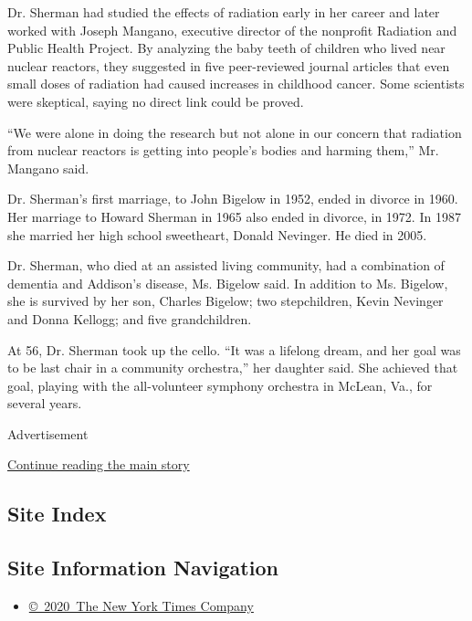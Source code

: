 Dr. Sherman had studied the effects of radiation early in her career and
later worked with Joseph Mangano, executive director of the nonprofit
Radiation and Public Health Project. By analyzing the baby teeth of
children who lived near nuclear reactors, they suggested in five
peer-reviewed journal articles that even small doses of radiation had
caused increases in childhood cancer. Some scientists were skeptical,
saying no direct link could be proved.

``We were alone in doing the research but not alone in our concern that
radiation from nuclear reactors is getting into people's bodies and
harming them,'' Mr. Mangano said.

Dr. Sherman's first marriage, to John Bigelow in 1952, ended in divorce
in 1960. Her marriage to Howard Sherman in 1965 also ended in divorce,
in 1972. In 1987 she married her high school sweetheart, Donald
Nevinger. He died in 2005.

Dr. Sherman, who died at an assisted living community, had a combination
of dementia and Addison's disease, Ms. Bigelow said. In addition to Ms.
Bigelow, she is survived by her son, Charles Bigelow; two stepchildren,
Kevin Nevinger and Donna Kellogg; and five grandchildren.

At 56, Dr. Sherman took up the cello. ``It was a lifelong dream, and her
goal was to be last chair in a community orchestra,'' her daughter said.
She achieved that goal, playing with the all-volunteer symphony
orchestra in McLean, Va., for several years.

Advertisement

\protect\hyperlink{after-bottom}{Continue reading the main story}

\hypertarget{site-index}{%
\subsection{Site Index}\label{site-index}}

\hypertarget{site-information-navigation}{%
\subsection{Site Information
Navigation}\label{site-information-navigation}}

\begin{itemize}
\tightlist
\item
  \href{https://help.nytimes3xbfgragh.onion/hc/en-us/articles/115014792127-Copyright-notice}{©~2020~The
  New York Times Company}
\end{itemize}

